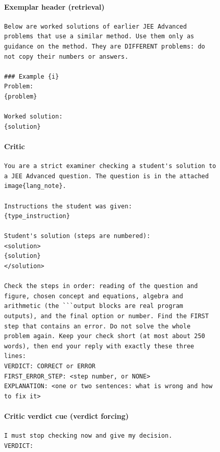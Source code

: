 \paragraph{Exemplar header (retrieval)}
\begin{scriptsize}\begin{verbatim}
Below are worked solutions of earlier JEE Advanced
problems that use a similar method. Use them only as
guidance on the method. They are DIFFERENT problems: do
not copy their numbers or answers.

### Example {i}
Problem:
{problem}

Worked solution:
{solution}
\end{verbatim}\end{scriptsize}

\paragraph{Critic}
\begin{scriptsize}\begin{verbatim}
You are a strict examiner checking a student's solution to
a JEE Advanced question. The question is in the attached
image{lang_note}.

Instructions the student was given:
{type_instruction}

Student's solution (steps are numbered):
<solution>
{solution}
</solution>

Check the steps in order: reading of the question and
figure, chosen concept and equations, algebra and
arithmetic (the ```output blocks are real program
outputs), and the final option or number. Find the FIRST
step that contains an error. Do not solve the whole
problem again. Keep your check short (at most about 250
words), then end your reply with exactly these three
lines:
VERDICT: CORRECT or ERROR
FIRST_ERROR_STEP: <step number, or NONE>
EXPLANATION: <one or two sentences: what is wrong and how
to fix it>
\end{verbatim}\end{scriptsize}

\paragraph{Critic verdict cue (verdict forcing)}
\begin{scriptsize}\begin{verbatim}
I must stop checking now and give my decision.
VERDICT:
\end{verbatim}\end{scriptsize}

